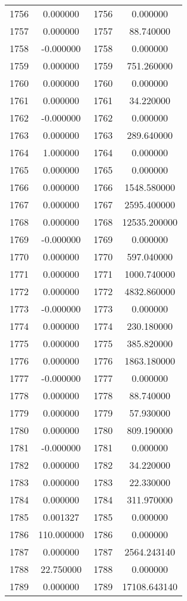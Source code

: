 \documentclass[12pt]{article}
\begin{document}
\begin{longtable}{@{}cccc@{}}
1756 & 0.000000 & 1756 & 0.000000 \\
1757 & 0.000000 & 1757 & 88.740000 \\
1758 & -0.000000 & 1758 & 0.000000 \\
1759 & 0.000000 & 1759 & 751.260000 \\
1760 & 0.000000 & 1760 & 0.000000 \\
1761 & 0.000000 & 1761 & 34.220000 \\
1762 & -0.000000 & 1762 & 0.000000 \\
1763 & 0.000000 & 1763 & 289.640000 \\
1764 & 1.000000 & 1764 & 0.000000 \\
1765 & 0.000000 & 1765 & 0.000000 \\
1766 & 0.000000 & 1766 & 1548.580000 \\
1767 & 0.000000 & 1767 & 2595.400000 \\
1768 & 0.000000 & 1768 & 12535.200000 \\
1769 & -0.000000 & 1769 & 0.000000 \\
1770 & 0.000000 & 1770 & 597.040000 \\
1771 & 0.000000 & 1771 & 1000.740000 \\
1772 & 0.000000 & 1772 & 4832.860000 \\
1773 & -0.000000 & 1773 & 0.000000 \\
1774 & 0.000000 & 1774 & 230.180000 \\
1775 & 0.000000 & 1775 & 385.820000 \\
1776 & 0.000000 & 1776 & 1863.180000 \\
1777 & -0.000000 & 1777 & 0.000000 \\
1778 & 0.000000 & 1778 & 88.740000 \\
1779 & 0.000000 & 1779 & 57.930000 \\
1780 & 0.000000 & 1780 & 809.190000 \\
1781 & -0.000000 & 1781 & 0.000000 \\
1782 & 0.000000 & 1782 & 34.220000 \\
1783 & 0.000000 & 1783 & 22.330000 \\
1784 & 0.000000 & 1784 & 311.970000 \\
1785 & 0.001327 & 1785 & 0.000000 \\
1786 & 110.000000 & 1786 & 0.000000 \\
1787 & 0.000000 & 1787 & 2564.243140 \\
1788 & 22.750000 & 1788 & 0.000000 \\
1789 & 0.000000 & 1789 & 17108.643140 \\

\end{longtable}
\end{document}

